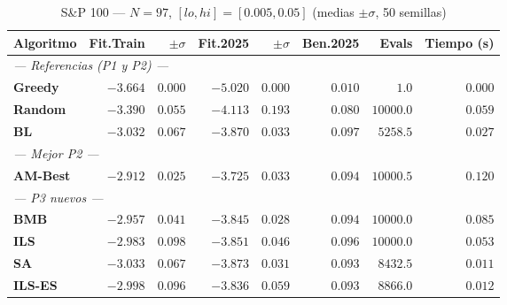 \documentclass[12pt,a4paper]{article}
\begin{document}
\begin{table}[H]
\centering\footnotesize
\caption{S\&P 100 --- $N=97$, $[lo,hi]=[0.005,0.05]$ (medias $\pm\sigma$, 50 semillas)}
\begin{tabular}{lrrrrrr r}
\toprule
\textbf{Algoritmo} & \textbf{Fit.Train} & $\pm\sigma$ & \textbf{Fit.2025} & $\pm\sigma$ & \textbf{Ben.2025} & \textbf{Evals} & \textbf{Tiempo (s)} \\
\midrule
\multicolumn{8}{l}{\textit{--- Referencias (P1 y P2) ---}} \\
\textbf{Greedy}   & $-3.664$ & $0.000$ & $-5.020$ & $0.000$ & $0.010$ & $1.0$      & $0.000$ \\
\textbf{Random}   & $-3.390$ & $0.055$ & $-4.113$ & $0.193$ & $0.080$ & $10000.0$  & $0.059$ \\
\textbf{BL}       & $-3.032$ & $0.067$ & $-3.870$ & $0.033$ & $0.097$ & $5258.5$   & $0.027$ \\
\multicolumn{8}{l}{\textit{--- Mejor P2 ---}} \\
\textbf{AM-Best}  & $-2.912$ & $0.025$ & $-3.725$ & $0.033$ & $0.094$ & $10000.5$  & $0.120$ \\
\multicolumn{8}{l}{\textit{--- P3 nuevos ---}} \\
\textbf{BMB}      & $\mathbf{-2.957}$ & $0.041$ & $\mathbf{-3.845}$ & $0.028$ & $\mathbf{0.094}$ & $10000.0$  & $0.085$ \\
\textbf{ILS}      & $-2.983$ & $0.098$ & $-3.851$ & $0.046$ & $0.096$ & $10000.0$  & $0.053$ \\
\textbf{SA}       & $-3.033$ & $0.067$ & $-3.873$ & $0.031$ & $0.093$ & $8432.5$   & $0.011$ \\
\textbf{ILS-ES}   & $-2.998$ & $0.096$ & $-3.836$ & $0.059$ & $0.093$ & $8866.0$   & $0.012$ \\
\bottomrule
\end{tabular}
\end{table}
\end{document}
